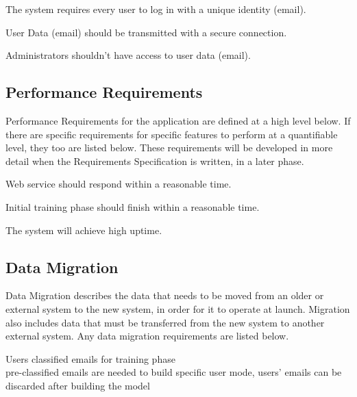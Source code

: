 \documentclass[a4paper,10pt]{article}
\newenvironment{my_enumerate}
{\begin{enumerate}
  \setlength{\itemsep}{0cm}
  \setlength{\parskip}{0cm}}
{\end{enumerate}}
\begin{document}
\begin{my_enumerate}
  \item The system requires every user to log in with a unique identity (email).
  \item User Data (email) should be transmitted with a secure connection.
  \item Administrators shouldn’t have access to user data (email).
\end{my_enumerate}



\subsection{Performance Requirements}
Performance Requirements for the application are defined at a high level below. 
If there are specific requirements for specific features to perform at a quantifiable 
level, they too are listed below. These requirements will be developed in more detail when 
the Requirements Specification is written, in a later phase.

\begin{my_enumerate}
  \item Web service should respond within a reasonable time.
  \item Initial training phase should finish within a reasonable time.
  \item The system will achieve high uptime.
\end{my_enumerate}


\subsection{Data Migration}
Data Migration describes the data that needs to be moved from an older or external 
system to the new system, in order for it to operate at launch. Migration also includes 
data that must be transferred from the new system to another external system. 
Any data migration requirements are listed below.

\begin{my_enumerate}
  \item Users classified emails for training phase \\
	pre-classified emails are needed to build specific user mode, users' emails can be discarded after building the model
\end{my_enumerate}
\end{document}
